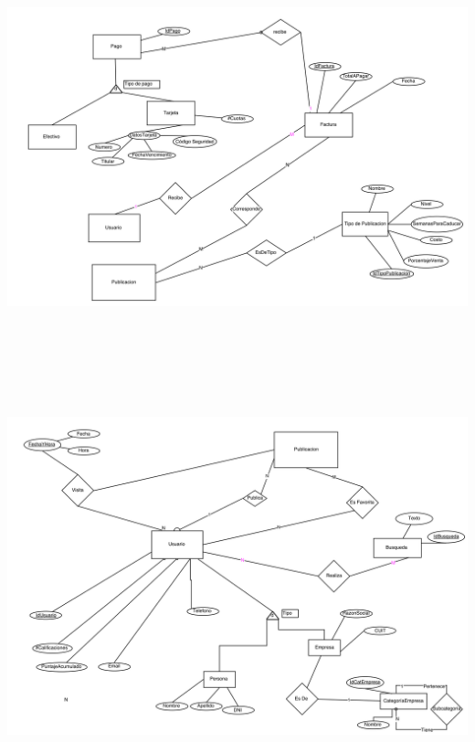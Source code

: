 \documentclass[a4paper, 10pt, twoside]{article}
\begin{document}
\includegraphics[width=18cm, height=12cm]{der3}
\includegraphics[width=18cm, height=12cm]{der4}
\end{document}
